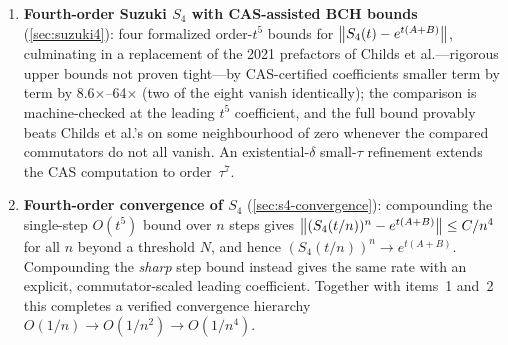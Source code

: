 \begin{enumerate}
  \item \textbf{Fourth-order Suzuki $S_4$ with CAS-assisted BCH bounds}
    (\cref{sec:suzuki4}):
    four formalized order-$t^5$ bounds for
    $\left\|S_4(t) - e^{t(A+B)}\right\|$, culminating in a replacement of the 2021
    prefactors of Childs et al.---rigorous upper bounds not proven
    tight---by CAS-certified coefficients smaller term by term by
    8.6$\times$--64$\times$ (two of the eight vanish identically); the
    comparison is machine-checked at the leading $t^5$ coefficient, and the
    full bound provably beats Childs et al.'s on some neighbourhood of
    zero whenever the compared commutators do not all vanish. An
    existential-$\delta$ small-$\tau$ refinement extends the CAS
    computation to order~$\tau^7$.

  \item \textbf{Fourth-order convergence of $S_4$} (\cref{sec:s4-convergence}):
    compounding the single-step $O(t^5)$ bound over $n$ steps gives
    $\left\|(S_4(t/n))^n - e^{t(A+B)}\right\| \le C/n^4$ for all $n$ beyond a threshold
    $N$, and hence $(S_4(t/n))^n \to e^{t(A+B)}$. Compounding the \emph{sharp}
    step bound instead gives the same rate with an explicit, commutator-scaled
    leading coefficient. Together with items~1
    and~2 this completes a verified convergence hierarchy
    $O(1/n) \to O(1/n^2) \to O(1/n^4)$.
\end{enumerate}


